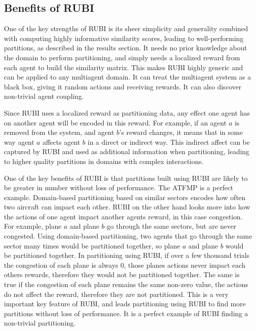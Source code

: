 \documentclass{aamas2014}
\begin{document}
\vspace{14mm}
\subsection{Benefits of RUBI}
One of the key strengths of RUBI is its sheer simplicity and generality combined with computing highly informative similarity scores, leading to well-performing partitions, as described in the results section. It needs no prior knowledge about the domain to perform partitioning, and simply needs a localized reward from each agent to build the similarity matrix. This makes RUBI highly generic and can be applied to any multiagent domain. It can treat the multiagent system as a black box, giving it random actions and receiving rewards. It can also discover non-trivial agent coupling. 

Since RUBI uses a localized reward as partitioning data, any effect one agent has on another agent will be encoded in this reward. For example, if an agent $a$ is removed from the system, and agent $b$'s reward changes, it means that in some way agent $a$ affects agent $b$ in a direct or indirect way. This indirect affect can be captured by RUBI and used as additional information when partitioning, leading to higher quality partitions in domains with complex interactions.

One of the key benefits of RUBI is that partitions built using RUBI are likely to be greater in number without loss of performance. The ATFMP is a perfect example. Domain-based partitioning based on similar sectors encodes how often two aircraft can impact each other. RUBI on the other hand looks more into how the actions of one agent impact another agents reward, in this case congestion. For example, plane $a$ and plane $b$ go through the same sectors, but are never congested. Using domain-based partitioning, two agents that go through the same sector many times would be partitioned together, so plane $a$ and plane $b$ would be partitioned together. In partitioning using RUBI, if over a few thousand trials the congestion of each plane is always 0, those planes actions never impact each others rewards, therefore they would not be partitioned together. The same is true if the congestion of each plane remains the same non-zero value, the actions do not affect the reward, therefore they are not partitioned. This is a very important key feature of RUBI, and leads partitioning using RUBI to find more partitions without loss of performance. It is a perfect example of RUBI finding a non-trivial partitioning.
\end{document}
